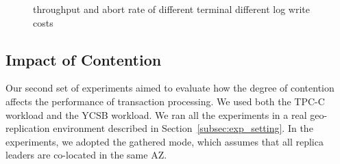 \documentclass[conference]{IEEEtran}
\begin{document}
\begin{figure}[htbp]
  \centering
\caption{throughput and abort rate of
different terminal different log write costs}
\label{fig:new_order_add_log_cost}
\end{figure}

\subsection{Impact of Contention}

Our second set of experiments aimed to evaluate how the degree of contention affects the performance of transaction processing.
We used both the TPC-C workload and the YCSB workload.
We ran all the experiments in a real geo-replication environment described in Section~\ref{subsec:exp_setting}.
In the experiments, we adopted the gathered mode, which assumes that all replica leaders are co-located in the same AZ. 
\end{document}
